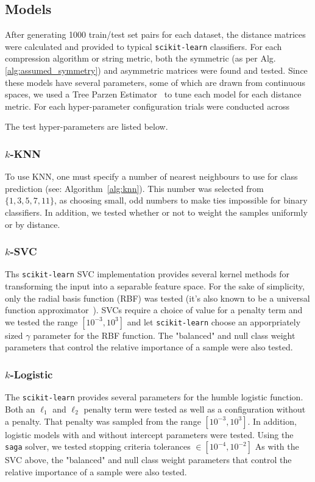 \documentclass[conference]{IEEEtran}
\begin{document}
\subsection{Models}

After generating 1000 train/test set pairs for each dataset, the distance matrices were calculated and provided to typical \texttt{scikit-learn} classifiers. For each compression algorithm or string metric, both the symmetric (as per  Alg. \ref{alg:assumed_symmetry}) and asymmetric matrices were found and tested. Since these models have several parameters, some of which are drawn from continuous spaces, we used a Tree Parzen Estimator~\cite{tpe} to tune each model for each distance metric. For each hyper-parameter configuration trials were conducted across 

The test hyper-parameters are listed below.

\label{models}
\subsubsection{$k$-KNN}
To use KNN, one must specify a number of nearest neighbours to use for class prediction (see: Algorithm~\ref{alg:knn}). This number was selected from $\{1,3,5,7,11\}$, as choosing small, odd numbers to make ties impossible for binary classifiers. In addition, we tested whether or not to weight the samples uniformly or by distance. 

\subsubsection{$k$-SVC}
Ths \texttt{scikit-learn} SVC implementation provides several kernel methods for transforming the input into a separable feature space. 
For the sake of simplicity, only the radial basis function (RBF) was tested (it's also known to be a universal function approximator~\cite{}). 
SVCs require a choice of value for a penalty term and we tested the range $[ 10^{-3}, 10^3]$ and let \texttt{scikit-learn} choose an apporpriately sized $\gamma$ parameter for the RBF function. 
The "balanced" and null class weight parameters that control the relative importance of a sample were also tested.

\subsubsection{$k$-Logistic}
The \texttt{scikit-learn} provides several parameters for the humble logistic function. Both an $\ell_1$ and $\ell_2$ penalty term were tested as well as a configuration without a penalty. That penalty was sampled from the range $[10^{-3}, 10^3]$. In addition, logistic models with and without intercept parameters were tested. Using the \texttt{saga} solver, we tested stopping criteria tolerances $\in [10^{-4}, 10^{-2}]$
As with the SVC above, the "balanced" and null class weight parameters that control the relative importance of a sample were also tested.
\end{document}

